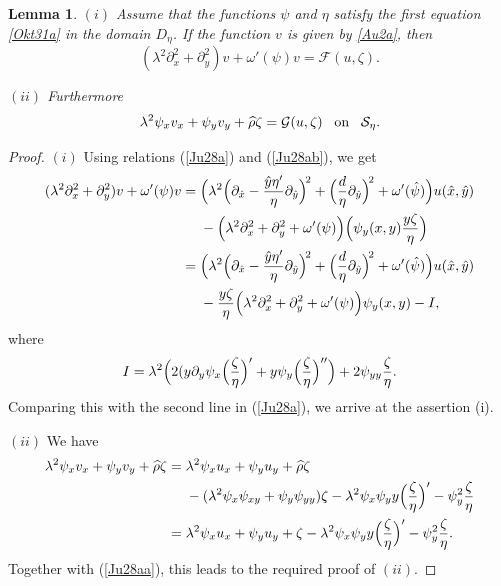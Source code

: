 \documentclass[oneside,a4paper,11pt]{article}
\newtheorem{lemma}[theorem]{Lemma}
\theoremstyle{thmstyletwo}%
\theoremstyle{thmstylethree}%
\numberwithin{equation}{section}
\begin{document}
\begin{lemma} $(i)$ Assume that the functions $\psi$ and $\eta$ satisfy the first equation\/ \eqref{Okt31a} in the domain $D_\eta$. If the function  $v$ is given by\/ \eqref{Au2a}, then
$$
(\lambda^2\partial_x^2+\partial_y^2)v+\omega'(\psi)v=\mathcal{F}(u,\zeta).
$$

$(ii)$ Furthermore
$$
\lambda^2\psi_xv_x+\psi_yv_y+\widehat{\rho}\zeta=\mathcal{G}(u,\zeta)\quad\mbox{\!on\!}\quad \mathcal{S}_\eta.
$$

\end{lemma}
\begin{proof} $(i)$ Using relations (\ref{Ju28a}) and (\ref{Ju28ab}), we get
\begin{align*}
(\lambda^2\partial_x^2+\partial_y^2)v+\omega'(\psi)v={}&\Bigl(\lambda^2\Bigl(\partial_{\hat{x}}-\frac{\hat{y}\eta'}{\eta}\partial_{\hat{y}}\Bigr)^{\!2}
+\Bigl(\frac{d}{\eta}\partial_{\hat{y}}\Bigr)^{\!2} +\omega'(\hat{\psi})\Bigr)u(\hat{x},\hat{y})\\
&{}-\Bigl(\lambda^2\partial_x^2+\partial_y^2+\omega'(\psi)\Bigr)\Bigl(\psi_{y}(x,y)\frac{y\zeta}{\eta}\Bigr)\\
{}={}&\Bigl(\lambda^2\Bigl(\partial_{\hat{x}}-\frac{\hat{y}\eta'}{\eta}\partial_{\hat{y}}\Bigr)^{\!2}+\Bigl(\frac{d}{\eta}\partial_{\hat{y}}\Bigr)^{\!2} +\omega'(\hat{\psi})\Bigr)u(\hat{x},\hat{y})\\
&{}-\frac{y\zeta}{\eta}\Bigl(\lambda^2\partial_x^2+\partial_y^2+\omega'(\psi)\Bigr)\psi_{y}(x,y)-I,
\end{align*}
where
\begin{equation*}
I=\lambda^2\Bigl(2(y\partial_y\psi_x\Bigl(\frac{\zeta}{\eta}\Bigr)'+y\psi_y\Bigl(\frac{\zeta}{\eta}\Bigr)''\Bigr)+2\psi_{yy}\frac{\zeta}{\eta}.
\end{equation*}
 Comparing this with the second line in (\ref{Ju28a}), we arrive at the assertion (i).

$(ii)$ We have
\begin{align*}
\lambda^2\psi_xv_x+\psi_yv_y+\widehat{\rho}\zeta={}&\lambda^2\psi_xu_x+\psi_yu_y+\widehat{\rho}\zeta\\
&{}-(\lambda^2\psi_x\psi_{xy}+\psi_y\psi_{yy})\zeta-\lambda^2\psi_x\psi_y y\Bigl(\frac{\zeta}{\eta}\Bigr)'-\psi_y^2\frac{\zeta}{\eta}\\
{}={}&\lambda^2\psi_xu_x+\psi_yu_y+\zeta-\lambda^2\psi_x\psi_y y\Bigl(\frac{\zeta}{\eta}\Bigr)'-\psi_y^2\frac{\zeta}{\eta}.
\end{align*}
Together with (\ref{Ju28aa}), this leads to the required proof of $(ii)$.
\end{proof}
\end{document}
